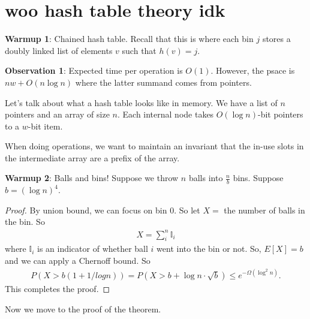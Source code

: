 \documentclass{report}
\begin{document}
\newpage
\section{
    woo hash table theory idk
}
\noindent \textbf{Warmup 1}: Chained hash table. Recall that this is where each bin $j$ stores a doubly linked list of elements $v$ such that $h(v) = j$. 

\noindent \textbf{Observation 1}: Expected time per operation is $O(1)$. However, the psace is $nw + O(n \log n)$ where the latter summand comes from pointers. 

Let's talk about what a hash table looks like in memory. We have a list of $n$ pointers  and an array of size $n$. Each internal node takes $O(\log n)$-bit pointers to a $w$-bit item. 

When doing operations, we want to maintain an invariant that the in-use slots in the intermediate array are a prefix of the array.

\noindent \textbf{Warmup 2}: Balls and bins! Suppose we throw $n$ balls into $\frac nb$ bins. Suppose $b = (\log n)^4$.

\begin{proof}
    By union bound, we can focus on bin 0. So let $X =$ the number of balls in the bin. So 
    \begin{align*}
        X = \sum_{i}^n \mathbb {I}_i
    \end{align*}
    where $\mathbb I_i$ is an indicator of whether ball $i$ went into the bin or not. So, $E[X] = b$ and we can apply a Chernoff bound. So 
    \begin{align*}
        P(X > b(1 + 1/log n)) = P(X > b + \log n \cdot \sqrt b)\leq e^{-\Omega(\log^2 n)}.
    \end{align*}
    This completes the proof.
\end{proof}
Now we move to the proof of the theorem.
\end{document}
